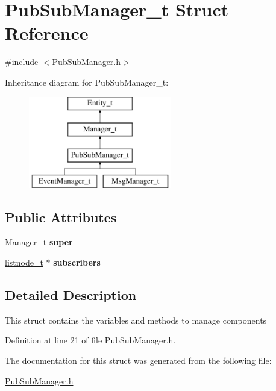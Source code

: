 \hypertarget{structPubSubManager__t}{
\section{PubSubManager\_\-t Struct Reference}
\label{structPubSubManager__t}
}


{\ttfamily \#include $<$PubSubManager.h$>$}

Inheritance diagram for PubSubManager\_\-t:\begin{figure}[H]
\begin{center}
\leavevmode
\includegraphics[height=4.000000cm]{structPubSubManager__t}
\end{center}
\end{figure}
\subsection*{Public Attributes}
\begin{DoxyCompactItemize}
\item 
\hypertarget{structPubSubManager__t_afc96ab80ee8e5005a82abead978b428e}{
\hyperlink{structManager__t}{Manager\_\-t} {\bfseries super}}
\label{structPubSubManager__t_afc96ab80ee8e5005a82abead978b428e}

\item 
\hypertarget{structPubSubManager__t_a845aae23a6609d056308fcf88a21333f}{
\hyperlink{structlnode}{listnode\_\-t} $\ast$ {\bfseries subscribers}}
\label{structPubSubManager__t_a845aae23a6609d056308fcf88a21333f}

\end{DoxyCompactItemize}


\subsection{Detailed Description}
This struct contains the variables and methods to manage components 

Definition at line 21 of file PubSubManager.h.



The documentation for this struct was generated from the following file:\begin{DoxyCompactItemize}
\item 
\hyperlink{PubSubManager_8h}{PubSubManager.h}\end{DoxyCompactItemize}
